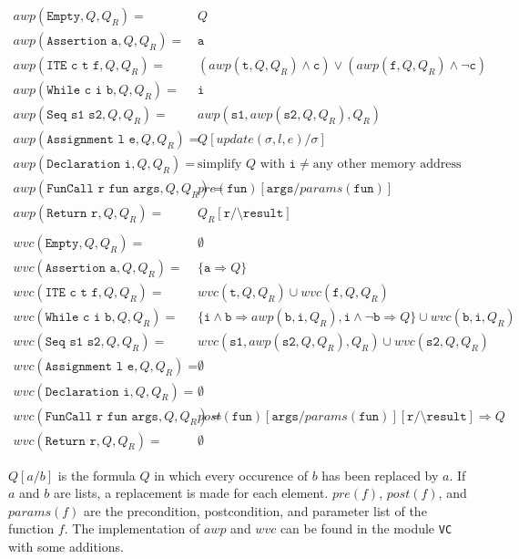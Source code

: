 \documentclass[12pt]{article}
\begin{document}
\begin{align*}
    awp(\texttt{Empty},Q,Q_{R})= & Q\\
    awp(\texttt{Assertion a},Q,Q_{R})= & \texttt{a}\\
    awp(\texttt{ITE c t f},Q,Q_{R})= & (awp(\texttt{t},Q,Q_{R})\wedge\texttt{c})\vee(awp(\texttt{f},Q,Q_{R})\wedge\lnot\texttt{c})\\
    awp(\texttt{While c i b},Q,Q_{R})= & \texttt{i}\\
    awp(\texttt{Seq s1 s2},Q,Q_{R})= & awp(\texttt{s1},awp(\texttt{s2},Q,Q_{R}),Q_{R})\\
    awp(\texttt{Assignment l e},Q,Q_{R})= & Q[update(\sigma,l,e)/\sigma]\\
    awp(\texttt{Declaration i},Q,Q_{R})= & \text{simplify }Q\text{ with }\texttt{i}\neq\text{any other memory address}\\
    awp(\texttt{FunCall r fun args},Q,Q_{R})= & pre(\texttt{fun})[\texttt{args}/params(\texttt{fun})]\\
    awp(\texttt{Return r},Q,Q_{R})= & Q_{R}[\texttt{r}/\texttt{\textbackslash result}]\\
    \\
    wvc(\texttt{Empty},Q,Q_{R})= & \emptyset\\
    wvc(\texttt{Assertion a},Q,Q_{R})= & \{\texttt{a}\Rightarrow Q\}\\
    wvc(\texttt{ITE c t f},Q,Q_{R})= & wvc(\texttt{t},Q,Q_{R})\cup wvc(\texttt{f},Q,Q_{R})\\
    wvc(\texttt{While c i b},Q,Q_{R})= & \{\texttt{i}\wedge\texttt{b}\Rightarrow awp(\texttt{b},\texttt{i},Q_{R}),\texttt{i}\wedge\lnot\texttt{b}\Rightarrow Q\}\cup wvc(\texttt{b},\texttt{i},Q_{R})\\
    wvc(\texttt{Seq s1 s2},Q,Q_{R})= & wvc(\texttt{s1},awp(\texttt{s2},Q,Q_{R}),Q_{R})\cup wvc(\texttt{s2},Q,Q_{R})\\
    wvc(\texttt{Assignment l e},Q,Q_{R})= & \emptyset\\
    wvc(\texttt{Declaration i},Q,Q_{R})= & \emptyset\\
    wvc(\texttt{FunCall r fun args},Q,Q_{R})= & post(\texttt{fun})[\texttt{args}/params(\texttt{fun})][\texttt{r}/\texttt{\textbackslash result}]\Rightarrow Q\\
    wvc(\texttt{Return r},Q,Q_{R})= & \emptyset
\end{align*}

$Q[a/b]$ is the formula $Q$ in which every occurence of $b$ has been replaced by $a$.
If $a$ and $b$ are lists, a replacement is made for each element.
$pre(f)$, $post(f)$, and $params(f)$ are the precondition, postcondition, and parameter list of the function $f$.
The implementation of $awp$ and $wvc$ can be found in the module \texttt{VC} with some additions.
\end{document}
